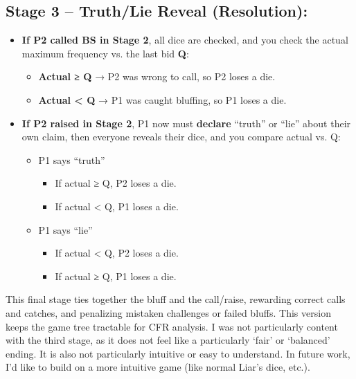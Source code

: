 \documentclass[
]{article}
\begin{document}
\subsection{\texorpdfstring{\textbf{Stage 3 -- Truth/Lie Reveal
(Resolution):}}{Stage 3 -- Truth/Lie Reveal (Resolution):}}\label{stage-3-truthlie-reveal-resolution}

\begin{itemize}
\item
  \textbf{If P2 called BS in Stage 2}, all dice are checked, and you
  check the actual maximum frequency vs. the last bid \textbf{Q}:

  \begin{itemize}
  \item
    \textbf{Actual ≥ Q} → P2 was wrong to call, so P2 loses a die.
  \item
    \textbf{Actual \textless{} Q} → P1 was caught bluffing, so P1 loses
    a die.
  \end{itemize}
\item
  \textbf{If P2 raised in Stage 2}, P1 now must \textbf{declare}
  ``truth'' or ``lie'' about their own claim, then everyone reveals
  their dice, and you compare actual vs. Q:

  \begin{itemize}
  \item
    P1 says ``truth''

    \begin{itemize}
    \item
      If actual ≥ Q, P2 loses a die.
    \item
      If actual \textless{} Q, P1 loses a die.
    \end{itemize}
  \item
    P1 says ``lie''

    \begin{itemize}
    \item
      If actual \textless{} Q, P2 loses a die.
    \item
      If actual ≥ Q, P1 loses a die.
    \end{itemize}
  \end{itemize}
\end{itemize}

This final stage ties together the bluff and the call/raise, rewarding
correct calls and catches, and penalizing mistaken challenges or failed
bluffs. This version keeps the game tree tractable for CFR analysis. I
was not particularly content with the third stage, as it does not feel
like a particularly `fair' or `balanced' ending. It is also not
particularly intuitive or easy to understand. In future work, I'd like
to build on a more intuitive game (like normal Liar's dice, etc.).
\end{document}

